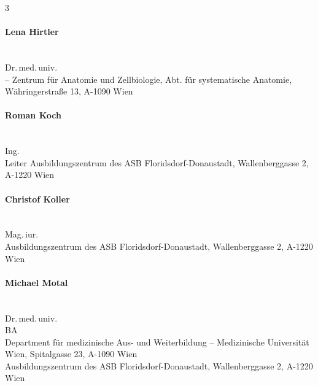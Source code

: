 \begin{WidePar}
\begin{raggedright}
\begin{multicols}{3}
  \bigskip

  \begin{minipage}{\linewidth}\raggedright
    \paragraph{Lena Hirtler}~~\\
    Dr.\,med.\,univ.
    \\[.25\baselineskip]
     --
    Zentrum für Anatomie und Zellbiologie, Abt. für systematische
    Anatomie, Währingerstraße 13, A-1090 Wien
  \end{minipage}

  \bigskip

  \begin{minipage}{\linewidth}\raggedright
    \paragraph{Roman Koch} ~~\\
    Ing.
    \\[.25\baselineskip]
    \noindent{}Leiter Ausbildungszentrum des {\color{AltBlueDark}ASB
    Florids\-dorf-Donau\-stadt}, Wallenberggasse 2, A-1220 Wien
  \end{minipage}

  \bigskip

  \begin{minipage}{\linewidth}\raggedright
    \paragraph{Christof Koller}~~\\
    Mag.\,iur.
    \\[.25\baselineskip]
    \noindent{}Ausbildungszentrum des {\color{AltBlueDark}ASB
    Florids\-dorf-Donau\-stadt}, Wallenberggasse 2, A-1220 Wien
  \end{minipage}

  \bigskip

  \begin{minipage}{\linewidth}\raggedright
    \paragraph{Michael Motal} ~~\\
    Dr.\,med.\,univ.
    \\
    BA
    \\[.25\baselineskip]
    \noindent{}Department für medizinische Aus- und
    Weiterbildung -- {\color{AltBlueDark}Medizinische Universität Wien},
    Spitalgasse 23, A-1090 Wien
    \\[.25\baselineskip]
    \noindent{}Ausbildungszentrum des {\color{AltBlueDark}ASB
    Florids\-dorf-Donau\-stadt}, Wallenberggasse 2, A-1220 Wien
  \end{minipage}


\end{multicols}
\end{raggedright}
\end{WidePar}

